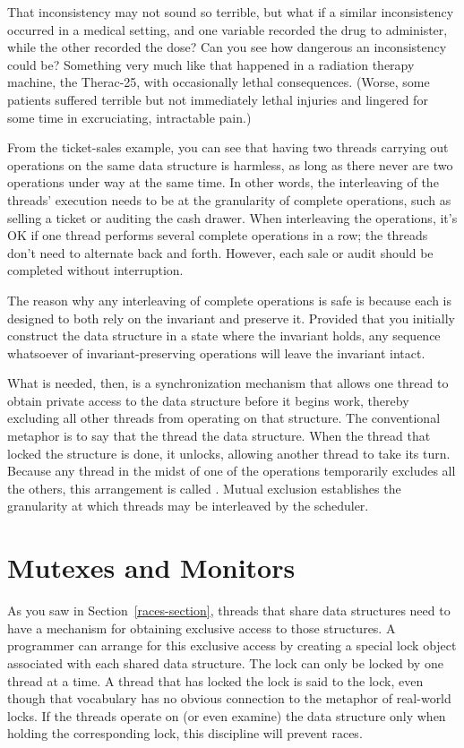 That inconsistency may not sound so terrible, but what if a similar
inconsistency occurred in a
medical setting, and one variable recorded the drug to administer,
while the other recorded the dose?  Can you see how dangerous an
inconsistency could be?  Something very much like that happened in a
radiation therapy machine, the Therac-25, with occasionally lethal
consequences.  (Worse, some patients suffered terrible but not
immediately lethal injuries and lingered for some time in
excruciating, intractable pain.)

From the ticket-sales example, you can see that having two
threads carrying out operations on the same data structure is
harmless, as long as there never are two operations under way at the
same time.  In other words, the interleaving of the threads' execution
needs to be at the granularity of complete operations, such as selling
a ticket or auditing the cash drawer.  When interleaving the operations,
it's OK if one thread performs
several complete operations in a row; the threads don't need to alternate back and forth.
However, each sale or audit should be completed without interruption.

The reason why any interleaving of complete operations is safe is
because each is designed to both rely on the invariant and preserve
it.  Provided that you initially construct the data structure in a state
where the invariant holds, any sequence whatsoever of
invariant-preserving operations will leave the invariant intact.

What is needed, then, is a synchronization mechanism that allows one
thread to obtain private access to the data structure before it begins work, thereby
excluding all other threads from operating on that structure.  The
conventional metaphor is to say that the thread  the data structure.
When
the thread that locked the structure is done, it unlocks, allowing
another thread to take its turn.  Because any thread in the midst of
one of the operations temporarily excludes all the others,
this arrangement is called .  Mutual exclusion establishes the
granularity at which threads may be interleaved by the scheduler.

\section{Mutexes and Monitors}\label{mutexes-and-monitors-section}

As you saw in Section~\ref{races-section}, threads that share data structures
need to have a mechanism for obtaining exclusive access to those
structures.  A programmer can arrange for this exclusive access by
creating a special lock object associated with each shared data
structure.  The lock can only be locked by one thread at a time.
A thread that has locked the lock is said to  the lock, even though that vocabulary has no obvious connection to the metaphor of real-world locks.
If
the threads operate on (or even examine) the data structure
only when holding the corresponding lock, this discipline will prevent
races.

